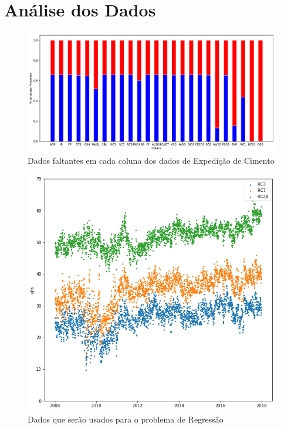 \documentclass{beamer}
\begin{document}
\section{Análise dos Dados}

\begin{frame}
\begin{figure}[H]
\centering
\includegraphics[scale=0.3]{slides_dados_pct}
\caption{Dados faltantes em cada coluna dos dados de Expedição de Cimento}
\end{figure}

\end{frame}

\begin{frame}
\begin{figure}[H]
\centering
\includegraphics[scale=0.4]{slides_dados}
\caption{Dados que serão usados para o problema de Regressão}
\end{figure}

\end{frame}
\end{document}
